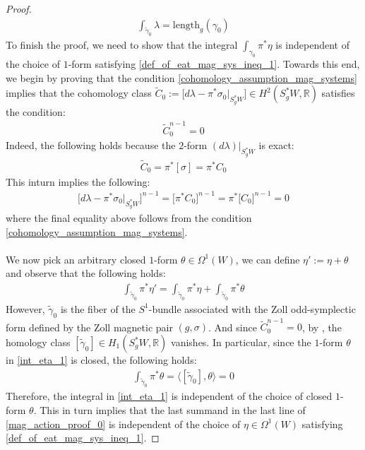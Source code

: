 \documentclass[11pt]{amsart}
\theoremstyle{plain}
\theoremstyle{definition}
\theoremstyle{remark}
\begin{document}
\begin{proof}
\begin{align}
    \int_{\tilde \gamma_0} \lambda = \text{length}_{g}(\gamma_0)
\end{align}
To finish the proof, we need to show that the integral $\int_{\gamma_0}\pi^*\eta$ is independent of the choice of $1$-form satisfying \eqref{def_of_eat_mag_sys_ineq_1}. Towards this end, we begin by proving that the condition \eqref{cohomology_assumption_mag_systems} implies that the cohomology class $\tilde C_0:= \Big[d\lambda-\pi^*\sigma_0\big|_{S_g^*W}\Big] \in H^2(S^*_gW,\mathbb{R})$ satisfies the condition:
\begin{align}
    \tilde C^{n-1}_0 =0
\end{align}
Indeed, the following holds because the $2$-form $(d\lambda)|_{S_g^*W}$ is exact:
\begin{align}
    \tilde C_0 = \pi^*[\sigma]= \pi^*C_0
\end{align}
This inturn implies the following:
\begin{align}
    \Big[d\lambda-\pi^*\sigma_0\big|_{S_g^*W}\Big]^{n-1} = \big[\pi^* C_0\big]^{n-1} = \pi^*\big[ C_0\big]^{n-1} =0
\end{align}
where the final equality above follows from the condition \eqref{cohomology_assumption_mag_systems}.\\
\\
We now pick an arbitrary closed $1$-form $\theta \in \Omega^1(W)$, we can define $\eta':= \eta + \theta$ and observe that the following holds:
\begin{align}\label{int_eta_1}
       \int_{\tilde \gamma_0}\pi^*\eta' = \int_{\tilde \gamma_0} \pi^*\eta + \int_{\tilde \gamma_0}\pi^*\theta 
\end{align}
However, $\tilde  \gamma_0$ is the fiber of the $S^1$-bundle associated with the Zoll odd-symplectic form defined by the Zoll magnetic pair $(g,\sigma)$. And since $\tilde C^{n-1}_0 =0$, by \cite[Lemma 4.5]{B-K-Odd_Symp}, the homology class $[\tilde  \gamma_0] \in H_1(S^*_gW,\mathbb{R})$ vanishes. In particular, since the $1$-form $\theta$ in \eqref{int_eta_1} is closed, the following holds:
\begin{align}
    \int_{\tilde \gamma_0}\pi^*\theta = \langle [\tilde  \gamma_0], \theta \rangle =0
\end{align}
Therefore, the integral in \eqref{int_eta_1} is independent of the choice of closed $1$-form  $\theta$. This in turn implies that the last summand in the last line of \eqref{mag_action_proof_0} is independent of the choice of $\eta \in \Omega^1(W)$ satisfying \eqref{def_of_eat_mag_sys_ineq_1}.
\end{proof}
\end{document}

